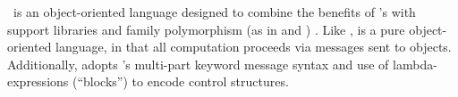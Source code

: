 
\Newspeak{}\,\citep{Bracha2010} is an object-oriented language designed to combine the benefits of \Smalltalk{}'s  with support libraries and family polymorphism (as in \BETA{} and \gBETA{}) . Like \Smalltalk{}, \Newspeak{} is a pure object-oriented language, in that all computation proceeds via messages sent to objects. Additionally, \Newspeak{} adopts \Smalltalk{}'s multi-part keyword message syntax and use of lambda-expressions (``blocks'') to encode control structures.
